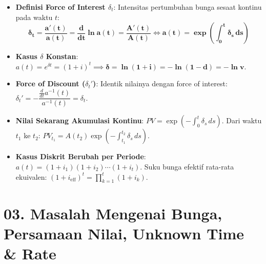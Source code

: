 \documentclass[10pt,a4paper]{article}
\begin{document}
\begin{teoremabox}
\begin{itemize}[leftmargin=1.5em, topsep=1.5pt, itemsep=2pt]
    \item \textbf{Definisi Force of Interest $\delta_t$}: Intensitas pertumbuhan bunga sesaat kontinu pada waktu $t$:
    \begin{equation*}
        \mathbf{\delta_t = \frac{a'(t)}{a(t)} = \frac{d}{dt} \ln a(t) = \frac{A'(t)}{A(t)}} \iff \mathbf{a(t) = \exp\left( \int_0^t \delta_s \, ds \right)}
    \end{equation*}
    \item \textbf{Kasus $\delta$ Konstan}: $a(t) = e^{\delta t} = (1+i)^t \implies \mathbf{\delta = \ln(1+i) = -\ln(1-d) = -\ln v}$.
    \item \textbf{Force of Discount ($\delta_t'$)}: Identik nilainya dengan force of interest: $\delta_t' = -\dfrac{\frac{d}{dt} a^{-1}(t)}{a^{-1}(t)} = \delta_t$.
    \item \textbf{Nilai Sekarang Akumulasi Kontinu}: $PV = \exp\left( -\int_0^t \delta_s \, ds \right)$. Dari waktu $t_1$ ke $t_2$: $PV_{t_1} = A(t_2) \exp\left( -\int_{t_1}^{t_2} \delta_s \, ds \right)$.
    \item \textbf{Kasus Diskrit Berubah per Periode}: $a(t) = (1+i_1)(1+i_2)\cdots(1+i_t)$. Suku bunga efektif rata-rata ekuivalen: $(1+i_{\text{eff}})^t = \prod_{k=1}^t (1+i_k)$.
\end{itemize}
\end{teoremabox}

\section*{\large 03. Masalah Mengenai Bunga, Persamaan Nilai, Unknown Time \& Rate}
\end{document}
